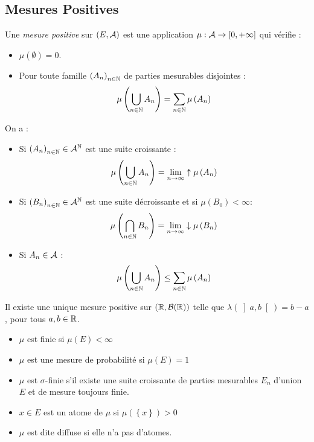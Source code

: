 \documentclass{cours}
\begin{document}
    \subsection{Mesures Positives}

    \begin{definition}
        Une \emph{mesure positive} sur $\left(E, \mathcal{A}\right)$ est une application $\mu : \mathcal{A} \rightarrow \left[0, +\infty\right]$ qui vérifie : 
        \begin{itemize}
            \item $\mu(\emptyset) = 0$.
            \item Pour toute famille $\left(A_{n}\right)_{n \in \mathbb{N}}$ de parties mesurables disjointes : \[\mu\left(\bigcup_{n \in \mathbb{N}}A_{n}\right) = \sum_{n \in \mathbb{N}} \mu\left(A_{n}\right)\]
        \end{itemize}
    \end{definition}

    \begin{proposition}
        On a : 
        \begin{itemize}
            \item Si $\left(A_{n}\right)_{n\in \mathbb{N}} \in \mathcal{A}^{\mathbb{N}}$ est une suite croissante :
            \[
                \mu\left(\bigcup_{n\in \mathbb{N}}A_{n}\right) = \lim_{n\to \infty} \uparrow \mu\left(A_{n}\right)
            \]
            \item Si $\left(B_{n}\right)_{n\in \mathbb{N}} \in \mathcal{A}^{\mathbb{N}}$ est une suite décroissante et si $\mu\left(B_{0}\right) < \infty$:
            \[
                \mu\left(\bigcap_{n\in \mathbb{N}}B_{n}\right) = \lim_{n\to \infty} \downarrow \mu\left(B_{n}\right)
            \]
            \item Si $A_{n} \in \mathcal{A}$ :
            \[
                \mu\left(\bigcup_{n \in \mathbb{N}} A_{n}\right) \leq \sum_{n\in\mathbb{N}} \mu\left(A_{n}\right)
            \]
        \end{itemize}
    \end{proposition}

    \begin{definition}
        Il existe une unique mesure positive sur $\left(\mathbb{R}, \mathcal{B}(\mathbb{R})\right)$ telle que $\lambda(\left]a, b\right[) = b - a$, pour tous $a, b \in \mathbb{R}$.
    \end{definition}

    \begin{definition}
        \begin{itemize}
            \item $\mu$ est finie si $\mu\left(E\right)<\infty$
            \item $\mu$ est une mesure de probabilité si $\mu(E) = 1$
            \item $\mu$ est $\sigma$-finie s'il existe une suite croissante de parties mesurables $E_{n}$ d'union $E$ et de mesure toujours finie.
            \item $x \in E$ est un atome de $\mu$ si $\mu\left(\left\{x\right\}\right) > 0$
            \item $\mu$ est dite diffuse si elle n'a pas d'atomes.
        \end{itemize}
    \end{definition}
\end{document}
